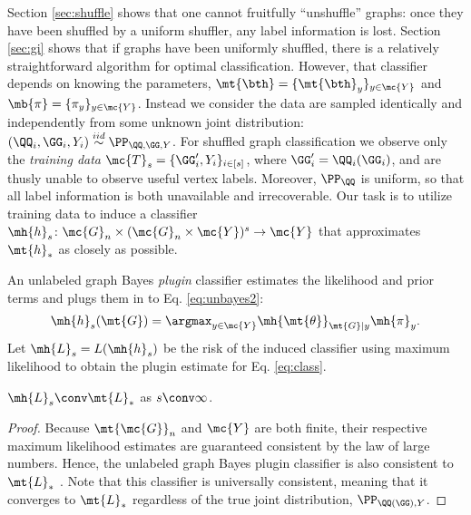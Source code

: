 Section \ref{sec:shuffle} shows that one cannot fruitfully ``unshuffle'' graphs: once they have been shuffled by a uniform shuffler, any label information is lost.  Section \ref{sec:gi} shows that if graphs have been uniformly shuffled, there is a relatively straightforward algorithm for optimal classification. However, that classifier depends on knowing the parameters, $\mt{\bth}=\{\mt{\bth}_y\}_{y\in \mc{Y}}$ and $\mb{\pi}=\{\pi_y\}_{y \in \mc{Y}}$. Instead we consider the data are sampled identically and independently from some unknown joint distribution: $(\QQ_i,\GG_i,Y_i)\overset{iid}{\sim}\PP_{\QQ,\GG,Y}$.  For shuffled graph classification we observe only the \emph{training data} $\mc{T}_s=\{\GG_i',Y_i\}_{i \in [s]}$, where $\GG_i'=\QQ_i(\GG_i)$, and are thusly unable to observe useful vertex labels.  Moreover, $\PP_{\QQ}$ is uniform, so that all label information is both unavailable and irrecoverable.  Our task is to utilize training data to induce a classifier $\mh{h}_s\colon \mc{G}_n \times (\mc{G}_n \times \mc{Y})^s \to \mc{Y}$ that approximates $\mt{h}_*$ as closely as possible.  

An unlabeled graph Bayes \emph{plugin} classifier estimates the likelihood and prior terms and plugs them in to Eq. \eqref{eq:unbayes2}:
\begin{align} \label{eq:class}
	\mh{h}_s(\mt{G})=\argmax_{y\in\mc{Y}} \mh{\mt{\theta}}_{\mt{G}|y}\mh{\pi}_y. %
\end{align}
Let $\mh{L}_s=L(\mh{h}_s)$ be the risk of the induced classifier using maximum likelihood to obtain the plugin estimate for Eq. \eqref{eq:class}. 

\begin{thm} \label{thm:4}
	$\mh{L}_s \conv \mt{L}_*$ as $s \conv \infty$.
\end{thm}

\begin{proof}
Because $\mt{\mc{G}}_n$ and $\mc{Y}$ are both finite, their respective maximum likelihood estimates are guaranteed consistent by the law of large numbers.  Hence,  the unlabeled graph Bayes plugin classifier is also consistent to $\mt{L}_*$ \cite{DEV96}. Note that this classifier is universally consistent, meaning that it converges to $\mt{L}_*$ regardless of the true joint distribution, $\PP_{\QQ(\GG) ,Y}$. %
\end{proof}


